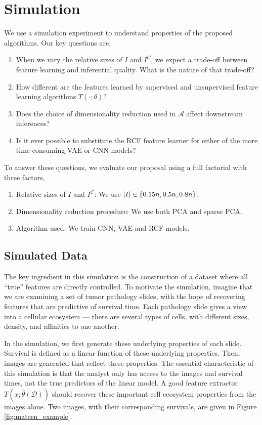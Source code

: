 
\section{Simulation}

We use a simulation experiment to understand properties of the proposed
algorithms. Our key questions are,

\begin{enumerate}
\item When we vary the relative sizes of $I$ and $I^{C}$, we expect a trade-off
  between feature learning and inferential quality. What is the nature of that
  trade-off?
\item How different are the features learned by supervised and unsupervised
  feature learning algorithms $T\left(\cdot; \theta\right)$?
\item Does the choice of dimensionality reduction used in $\mathcal{A}$ affect
  downstream inferences?
\item Is it ever possible to substitute the RCF feature learner for either of
  the more time-consuming VAE or CNN models?
\end{enumerate}

To answer these questions, we evaluate our proposal using a full factorial with
three factors,

\begin{enumerate}
\item Relative sizes of $I$ and $I^{C}$: We use $\left|I\right| \in \left\{0.15n, 0.5n, 0.8n\right\}$.
\item Dimensionality reduction procedure: We use both PCA and sparse PCA.
\item Algorithm used: We train CNN, VAE and RCF models.
\end{enumerate}

\subsection{Simulated Data}

The key ingredient in this simulation is the construction of a dataset where all
``true'' features are directly controlled. To motivate the simulation, imagine
that we are examining a set of tumor pathology slides, with the hope of
recovering features that are predictive of survival time. Each pathology slide
gives a view into a cellular ecosystem — there are several types of cells, with
different sizes, density, and affinities to one another.

In the simulation, we first generate these underlying properties of each slide.
Survival is defined as a linear function of these underlying properties. Then,
images are generated that reflect these properties. The essential characteristic
of this simulation is that the analyst only has access to the images and
survival times, not the true predictors of the linear model. A good feature
extractor $T\left(x; \hat{\theta}\left(\mathcal{D}\right)\right)$ should recover
these important cell ecosystem properties from the images alone. Two images,
with their corresponding survivals, are given in Figure
\ref{fig:matern_example}.

